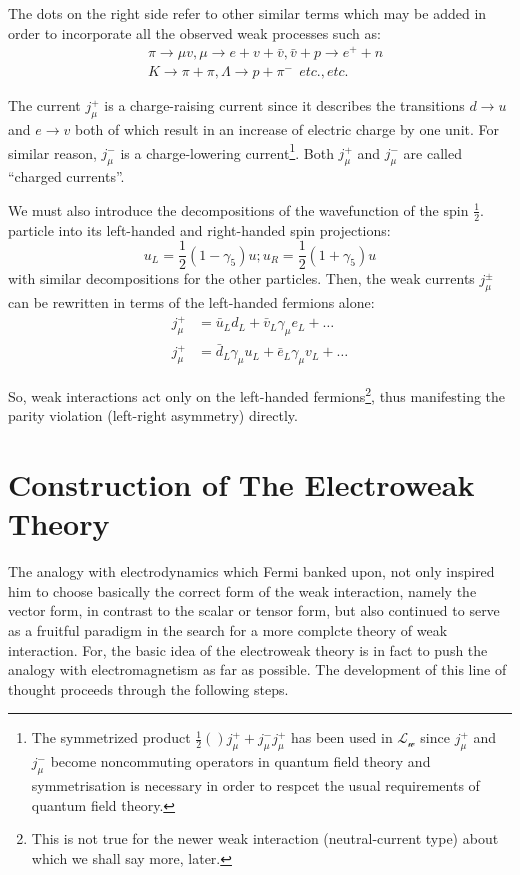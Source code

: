 The dots on the right side refer to other similar terms which may be added in order to incorporate all the observed weak processes such as: 
\begin{align*}
& \pi \rightarrow \mu v, \mu \rightarrow e + v + \bar{v}, \bar{v} + p \rightarrow e^{+} + n\\
& K \rightarrow \pi + \pi, \Lambda \rightarrow p + \pi^{-} ~~etc., etc.
\end{align*}

The current $j^{+}_{\mu}$ is a charge-raising current since it describes the transitions $d\rightarrow u$ and $e \rightarrow v$ both of which result in an increase of electric charge by one unit. For similar reason, $j^{-}_{\mu}$ is a charge-lowering current\footnote{The symmetrized product $\frac{1}{2}()j^{+}_{\mu} + j^{-}_{\mu}j^{+}_{\mu}$ has been used in $\mathcal{L_{w}}$ since $j^{+}_{\mu}$ and $j^{-}_{\mu}$ become noncommuting operators in quantum field theory and symmetrisation is necessary in order to respcet the usual requirements of quantum field theory.}. Both $j^{+}_{\mu}$ and $j^{-}_{\mu}$ are called “charged currents”. 

We must also introduce the decompositions of the wavefunction of the spin $\frac{1}{2}$. particle into its
left-handed and right-handed spin projections: 
\begin{equation*}
u_{L}= \frac{1}{2} (1-\gamma_{5})u; u_{R}= \frac{1}{2} (1+\gamma_{5})u\tag{2.7}
\end{equation*}
with similar decompositions for the other particles. Then, the weak currents $j^{\pm}_{\mu}$ can be rewritten in
terms of the left-handed fermions alone: 
\begin{align*}
j^{+}_{\mu} &= \bar{u}_{L}d_{L} + \bar{v}_{L}\gamma_{\mu}e_{L}+ \ldots\tag{2.8}\\
j^{+}_{\mu} &= \bar{d}_{L}\gamma_{\mu}u_{L}+ \bar{e}_{L}\gamma_{\mu}v_{L} + \ldots\tag{2.9}
\end{align*}

So, weak interactions act only on the left-handed fermions\footnote{This is not true for the newer weak interaction (neutral-current type) about which we shall say more, later.}, thus manifesting the parity violation
(left-right asymmetry) directly. 

\section{Construction of The Electroweak Theory}

The analogy with electrodynamics which Fermi banked upon, not only inspired him to choose
basically the correct form of the weak interaction, namely the vector form, in contrast to the scalar
or tensor form, but also continued to serve as a fruitful paradigm in the search for a more complcte
theory of weak interaction. For, the basic idea of the electroweak theory is in fact to push the
analogy with electromagnetism as far as possible. The development of this line of thought proceeds
through the following steps. 

